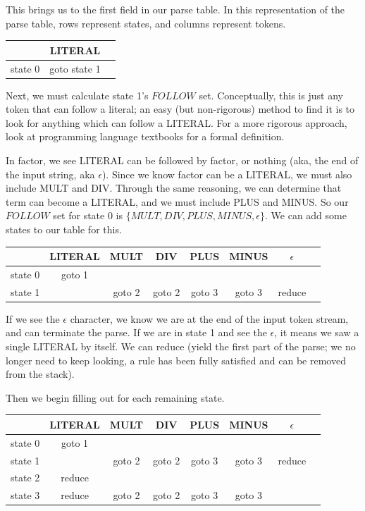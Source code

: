 \documentclass[]{article}
\begin{document}
This brings us to the first field in our parse table.
In this representation of the parse table, rows represent states, and columns represent tokens.

\begin{center}
	\begin{tabular}{| c | c | c |}
		\hline
		& LITERAL      & \\
		\hline
		state 0 & goto state 1 & \\
		\hline
	\end{tabular}
\end{center}

Next, we must calculate state 1's $FOLLOW$ set.
Conceptually, this is just any token that can follow a literal; an easy (but non-rigorous) method to find it is to look for anything which can follow a LITERAL.
For a more rigorous approach, look at programming language textbooks for a formal definition.

In factor, we see LITERAL can be followed by factor, or nothing (aka, the end of the input string, aka $\epsilon$).
Since we know factor can be a LITERAL, we must also include MULT and DIV.
Through the same reasoning, we can determine that term can become a LITERAL, and we must include PLUS and MINUS.
So our $FOLLOW$ set for state 0 is $\{MULT, DIV, PLUS, MINUS, \epsilon\}$.
We can add some states to our table for this.

\begin{center}
	\begin{tabular}{| c | c | c | c | c | c | c | c |}
		\hline
		& LITERAL      & MULT & DIV & PLUS & MINUS & $\epsilon$ \\
		\hline
		state 0 & goto 1 & & & & & \\
		state 1 &  & goto 2 & goto 2 & goto 3 & goto 3 & reduce \\
		\hline
	\end{tabular}
\end{center}

If we see the $\epsilon$ character, we know we are at the end of the input token stream, and can terminate the parse.
If we are in state 1 and see the $\epsilon$, it means we saw a single LITERAL by itself.
We can reduce (yield the first part of the parse; we no longer need to keep looking, a rule has been fully satisfied and can be removed from the stack).

Then we begin filling out for each remaining state.

\begin{center}
	\begin{tabular}{| c | c | c | c | c | c | c | c |}
		\hline
		& LITERAL      & MULT & DIV & PLUS & MINUS & $\epsilon$ \\
		\hline
		state 0 & goto 1 & & & & & \\
		state 1 &  & goto 2 & goto 2 & goto 3 & goto 3 & reduce \\
		state 2 & reduce & & & & & \\
		state 3 & reduce & goto 2 & goto 2 & goto 3 & goto 3 & \\
		\hline
	\end{tabular}
\end{center}
\end{document}
